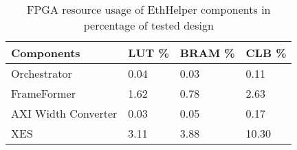 \begin{table}[]
\centering
\begin{tabular}{|l|l|l|l|}
\hline
Components & LUT \% & BRAM \% & CLB \% \\ \hline
Orchestrator & 0.04 & 0.03 & 0.11 \\ \hline
FrameFormer & 1.62 & 0.78 & 2.63 \\ \hline
AXI Width Converter & 0.03 & 0.05 & 0.17 \\ \hline
XES & 3.11 & 3.88 & 10.30 \\ \hline
\end{tabular}
\caption{FPGA resource usage of EthHelper components in percentage of tested design}
\label{tab:core_util}
\end{table}